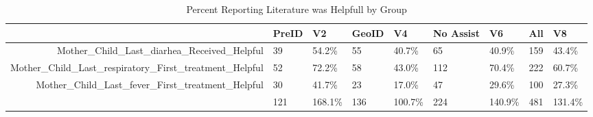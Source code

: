 \begin{table}[ht]
\centering
\begin{tabular}{rllllllll}
  \hline
 & PreID & V2 & GeoID & V4 & No Assist & V6 & All & V8 \\ 
  \hline
Mother\_Child\_Last\_diarhea\_Received\_Helpful & 39 & 54.2\% & 55 & 40.7\% & 65 & 40.9\% & 159 & 43.4\% \\ 
  Mother\_Child\_Last\_respiratory\_First\_treatment\_Helpful & 52 & 72.2\% & 58 & 43.0\% & 112 & 70.4\% & 222 & 60.7\% \\ 
  Mother\_Child\_Last\_fever\_First\_treatment\_Helpful & 30 & 41.7\% & 23 & 17.0\% & 47 & 29.6\% & 100 & 27.3\% \\ 
   & 121 & 168.1\% & 136 & 100.7\% & 224 & 140.9\% & 481 & 131.4\% \\ 
   \hline
\end{tabular}
\caption{Percent Reporting Literature was Helpfull by Group} 
\end{table}
